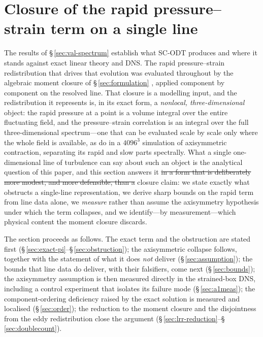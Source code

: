 \documentclass[lineno]{JFM-FLM_Au}
\newcounter{assumption}
\providecommand{\DIFadd}[1]{{\protect\color{blue}\uwave{#1}}} %
\providecommand{\DIFdel}[1]{{\protect\color{red}\sout{#1}}} %
\providecommand{\DIFaddbegin}{} %
\providecommand{\DIFaddend}{} %
\providecommand{\DIFdelbegin}{} %
\providecommand{\DIFdelend}{} %
\begin{document}
\section{Closure of the rapid pressure--strain term on a single line}\label{sec:gate}

The results of \S\,\ref{sec:val-spectrum} establish what SC-ODT
produces and where it stands against exact linear theory and DNS. The
rapid pressure--strain redistribution that drives that evolution was
evaluated throughout by the algebraic moment closure of
\S\,\ref{sec:formulation} \citep{LaunderReeceRodi1975}, applied component by
component on the resolved line. That closure is a modelling input, and the
redistribution it represents is, in its exact form, a \emph{nonlocal,
three-dimensional} object: the rapid pressure at a point is a volume
integral over the entire fluctuating field, and the pressure--strain
correlation is an integral over the full three-dimensional spectrum---one
that can be evaluated scale by scale only where the whole field is
available, as \citet{ClayYeung2016} do in a $4096^3$ simulation of
axisymmetric contraction, separating its rapid and slow parts spectrally.
What a
single one-dimensional line of turbulence can say about such an object is
the analytical question of this paper, and this section answers it \DIFdelbegin \DIFdel{in a form that is deliberately more modest, and more defensible, than a }\DIFdelend \DIFaddbegin \DIFadd{short of a }\DIFaddend closure claim: we state exactly what obstructs a single-line representation, we
derive sharp bounds on the rapid term from line data alone, we
\emph{measure} rather than assume the axisymmetry hypothesis under which
the term collapses, and we identify---by measurement---which physical
content the moment closure discards.

The section proceeds as follows. The exact term and the obstruction are
stated first (\S\,\ref{sec:exact-pi}--\S\,\ref{sec:obstruction}); the
axisymmetric collapse follows, together with the statement of what it does
\emph{not} deliver (\S\,\ref{sec:assumption}); the bounds that line data do
deliver, with their falsifiers, come next (\S\,\ref{sec:bounds}); the
axisymmetry assumption is then measured directly in the strained-box DNS,
including a control experiment that isolates its failure mode
(\S\,\ref{sec:a1meas}); the component-ordering deficiency raised by the
exact solution is measured and localised (\S\,\ref{sec:order}); the
reduction to the moment closure and the disjointness from the eddy
redistribution close the argument
(\S\,\ref{sec:lrr-reduction}--\S\,\ref{sec:doublecount}).
\end{document}
